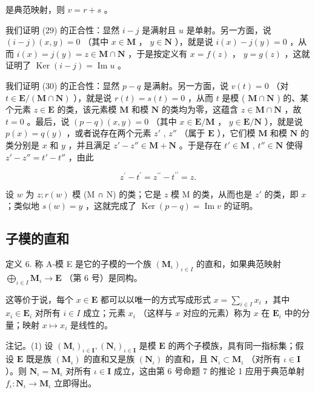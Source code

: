 是典范映射，则 \(v = r + s\) 。

我们证明 (29) 的正合性：显然 \(i-j\) 是满射且 \(u\) 是单射。另一方面，说 \((i-j)(x,y)=0\) （其中 \(x\in\mathbf{M}\) ， \(y\in\mathbf{N}\) ），就是说 \(i(x)-j(y)=0\) ，从而 \(i(x)=j(y)=z\in\mathbf{M}\cap\mathbf{N}\) ，于是按定义有 \(x=f(z)\) ， \(y=g(z)\) ，这就证明了 \(\operatorname{Ker}(i-j)=\operatorname{Im}u\) 。

我们证明 (30) 的正合性：显然 \(p - q\) 是满射。另一方面，说 \(v(t) = 0\) （对 \(t \in \mathbf{E} / (\mathbf{M} \cap \mathbf{N})\) ），就是说 \(r(t) = s(t) = 0\) ，从而 \(t\) 是模 ( \(\mathbf{M} \cap \mathbf{N}\) ) 的、某个元素 \(z \in \mathbf{E}\) 的类，该元素模 \(\mathbf{M}\) 和模 \(\mathbf{N}\) 的类均为零，这蕴含 \(z \in \mathbf{M} \cap \mathbf{N}\) ，故 \(t = 0\) 。最后，说 \((p - q)(x, y) = 0\) （其中 \(x \in \mathbf{E} / \mathbf{M}\) ， \(y \in \mathbf{E} / \mathbf{N}\) ），就是说 \(p(x) = q(y)\) ，或者说存在两个元素 \(z'\) , \(z''\) （属于 \(\mathbf{E}\) ），它们模 \(\mathbf{M}\) 和模 \(\mathbf{N}\) 的类分别是 \(x\) 和 \(y\) ，并且满足 \(z' - z'' \in \mathbf{M} + \mathbf{N}\) 。于是存在 \(t' \in \mathbf{M}\) , \(t'' \in \mathbf{N}\) 使得 \(z' - z'' = t' - t''\) ，由此

\[
z ^ {\prime} - t ^ {\prime} = z ^ {\prime \prime} - t ^ {\prime \prime} = z.
\]

设 \(w\) 为 \(z; r(w)\) 模 (M ∩ N) 的类；它是 \(z\) 模 M 的类，从而也是 \(z'\) 的类，即 \(x\) ；类似地 \(s(w) = y\) ，这就完成了 \(\operatorname{Ker}(p - q) = \operatorname{Im} v\) 的证明。

\subsection{子模的直和}

定义 6. 称 A-模 E 是它的子模的一个族 \((\mathbf{M}_{\iota})_{\iota \in I}\) 的直和，如果典范映射 \(\bigoplus_{\iota \in I} \mathbf{M}_{\iota} \to \mathbf{E}\) （第 6 号）是同构。

这等价于说，每个 \(x \in \mathbf{E}\) 都可以以唯一的方式写成形式 \(x = \sum_{i \in I} x_i\) ，其中 \(x_i \in \mathbf{E}_i\) 对所有 \(i \in I\) 成立；元素 \(x_i\) （这样与 \(x\) 对应的元素）称为 \(x\) 在 \(\mathbf{E}_i\) 中的分量；映射 \(x \mapsto x_i\) 是线性的。

注记。(1) 设 \((\mathbf{M}_{\iota})_{\iota \in \mathbf{I}}, (\mathbf{N}_{\iota})_{\iota \in \mathbf{I}}\) 是模 \(\mathbf{E}\) 的两个子模族，具有同一指标集；假设 \(\mathbf{E}\) 既是族 \((\mathbf{M}_{\iota})\) 的直和又是族 \((\mathbf{N}_{\iota})\) 的直和，且 \(\mathbf{N}_{\iota} \subset \mathbf{M}_{\iota}\) （对所有 \(\iota \in \mathbf{I}\) ）。则 \(\mathbf{N}_{\iota} = \mathbf{M}_{\iota}\) 对所有 \(\iota \in \mathbf{I}\) 成立，这由第 6 号命题 7 的推论 1 应用于典范单射 \(f_{\iota}: \mathbf{N}_{\iota} \to \mathbf{M}_{\iota}\) 立即得出。

